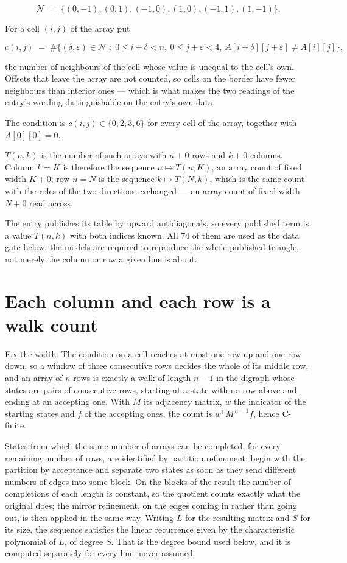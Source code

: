 \documentclass[11pt]{article}
\theoremstyle{definition}
\begin{document}
\[\mathcal{N} \;=\; \{(0,-1), (0,1), (-1,0), (1,0), (-1,1), (1,-1)\}.\]

For a cell $(i,j)$ of the array put

\[c(i,j) \;=\; \#\bigl\{(\delta,\varepsilon)\in\mathcal{N} \;:\; 0\le i+\delta<n,\ 0\le j+\varepsilon<4,\ A[i+\delta][j+\varepsilon] \neq A[i][j]\bigr\},\]

the number of neighbours of the cell whose value is unequal to the cell's own. Offsets that leave the array are not counted, so cells on the border have fewer neighbours than interior ones --- which is what makes the two readings of the entry's wording distinguishable on the entry's own data.

The condition is $c(i,j) \in \{0, 2, 3, 6\}$ for every cell of the array, together with $A[0][0]=0$.

$T(n,k)$ is the number of such arrays with $n + 0$ rows and $k + 0$ columns. Column $k = K$ is therefore the sequence $n \mapsto T(n,K)$, an array count of fixed width $K + 0$; row $n = N$ is the sequence $k \mapsto T(N,k)$, which is the same count with the roles of the two directions exchanged --- an array count of fixed width $N + 0$ read across.

The entry publishes its table by upward antidiagonals, so every published term is a value $T(n,k)$ with both indices known. All 74 of them are used as the data gate below: the models are required to reproduce the whole published triangle, not merely the column or row a given line is about.

\section{Each column and each row is a walk count}

Fix the width. The condition on a cell reaches at most one row up and one row down, so a window of three consecutive rows decides the whole of its middle row, and an array of $n$ rows is exactly a walk of length $n-1$ in the digraph whose states are pairs of consecutive rows, starting at a state with no row above and ending at an accepting one. With $M$ its adjacency matrix, $w$ the indicator of the starting states and $f$ of the accepting ones, the count is $w^{\mathsf T}M^{\,n-1}f$, hence C-finite.

States from which the same number of arrays can be completed, for every remaining number of rows, are identified by partition refinement: begin with the partition by acceptance and separate two states as soon as they send different numbers of edges into some block. On the blocks of the result the number of completions of each length is constant, so the quotient counts exactly what the original does; the mirror refinement, on the edges coming in rather than going out, is then applied in the same way. Writing $L$ for the resulting matrix and $S$ for its size, the sequence satisfies the linear recurrence given by the characteristic polynomial of $L$, of degree $S$. That is the degree bound used below, and it is computed separately for every line, never assumed.
\end{document}
